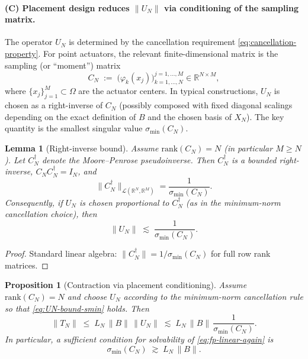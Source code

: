 \documentclass[11pt,a4paper]{article}
\numberwithin{equation}{section}
\newtheorem{lemma}[theorem]{Lemma}
\newtheorem{proposition}[theorem]{Proposition}
\theoremstyle{definition}
\newcommand{\1}{\mathbbm{1}}
\begin{document}
\paragraph{(C) Placement design reduces $\|U_N\|$ via conditioning of the sampling matrix.}
The operator $U_N$ is determined by the cancellation requirement \eqref{eq:cancellation-property}.
For point actuators, the relevant finite-dimensional matrix is the sampling (or ``moment'') matrix
\begin{equation}
\label{eq:CN-def}
C_N \;:=\; \bigl(\varphi_k(x_j)\bigr)_{k=1,\dots,N}^{j=1,\dots,M}\in\mathbb{R}^{N\times M},
\end{equation}
where $\{x_j\}_{j=1}^M\subset\Omega$ are the actuator centers. In typical constructions, $U_N$ is chosen as a right-inverse
of $C_N$ (possibly composed with fixed diagonal scalings depending on the exact definition of $B$ and the chosen basis of $X_N$).
The key quantity is the smallest singular value $\sigma_{\min}(C_N)$.

\begin{lemma}[Right-inverse bound]
\label{lem:right-inverse-bound}
Assume $\mathrm{rank}(C_N)=N$ (in particular $M\ge N$). Let $C_N^\dagger$ denote the Moore--Penrose pseudoinverse.
Then $C_N^\dagger$ is a bounded right-inverse, $C_N C_N^\dagger=I_N$, and
\begin{equation}
\label{eq:pseudoinverse-norm}
\|C_N^\dagger\|_{\mathcal{L}(\mathbb{R}^N,\mathbb{R}^M)} = \frac{1}{\sigma_{\min}(C_N)}.
\end{equation}
Consequently, if $U_N$ is chosen proportional to $C_N^\dagger$ (as in the minimum-norm cancellation choice), then
\begin{equation}
\label{eq:UN-bound-smin}
\|U_N\|\;\lesssim\;\frac{1}{\sigma_{\min}(C_N)}.
\end{equation}
\end{lemma}

\begin{proof}
Standard linear algebra: $\|C_N^\dagger\|=1/\sigma_{\min}(C_N)$ for full row rank matrices.
\end{proof}

\begin{proposition}[Contraction via placement conditioning]
\label{prop:placement-contraction}
Assume $\mathrm{rank}(C_N)=N$ and choose $U_N$ according to the minimum-norm cancellation rule so that
\eqref{eq:UN-bound-smin} holds. Then
\begin{equation}
\label{eq:placement-criterion}
\|T_N\| \;\le\; L_N\,\|B\|\,\|U_N\|
\;\lesssim\;
L_N\,\|B\|\,\frac{1}{\sigma_{\min}(C_N)}.
\end{equation}
In particular, a sufficient condition for solvability of \eqref{eq:fp-linear-again} is
\begin{equation}
\label{eq:smin-threshold}
\sigma_{\min}(C_N)\;\gtrsim\; L_N\,\|B\|.
\end{equation}
\end{proposition}
\end{document}
